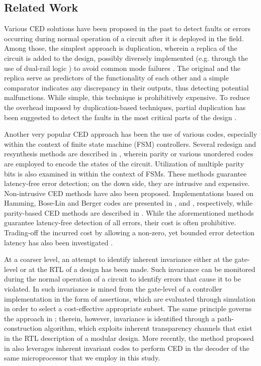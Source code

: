 \documentclass[12pt]{yalephd}
\begin{document}
\subsection{Related Work}\label{sC3sPrevious}

Various CED solutions \cite{GoGr93,MiMc00} have been proposed in the past to detect faults or errors occurring during normal operation of a circuit after it is deployed in the field. Among those, the simplest approach is duplication, wherein a replica of the circuit is added to the design, possibly diversely implemented (e.g. through the use of dual-rail logic \cite{923436}) to avoid common mode failures \cite{AvKe84}. The original and the replica serve as predictors of the functionality of each other and a simple comparator indicates any discrepancy in their outputs, thus detecting potential malfunctions. While simple, this technique is prohibitively expensive. To reduce the overhead imposed by duplication-based techniques, partial duplication has been suggested to detect the faults in the most critical parts of the design \cite{Mo03b}.

Another very popular CED approach has been the use of various codes, especially within the context of finite state machine (FSM) controllers. Several redesign and resynthesis methods are described in \cite{AkSo75, DhVr88}, wherein parity or various unordered codes are employed to encode the states of the circuit. Utilization of multiple parity bits is also examined in \cite{ZSM98} within the context of FSMs. These methods guarantee latency-free error detection; on the down side, they are intrusive and expensive. Non-intrusive CED methods have also been proposed. Implementations based on Hamming, Bose-Lin and Berger codes are presented in \cite{1030186}, \cite{670885} and \cite{229762}, respectively, while parity-based CED methods are described in \cite{GoGr93,ADM06,1676055}. While the aforementioned methods guarantee latency-free detection of all errors, their cost is often prohibitive. Trading-off the incurred cost by allowing a non-zero, yet bounded error detection latency has also been investigated \cite{AMD04}.

At a coarser level, an attempt to identify inherent invariance either at the gate-level \cite{VJAPG08} or at the RTL \cite{1308673} of a design has been made. Such invariance can be monitored during the normal operation of a circuit to identify errors that cause it to be violated. In \cite{VJAPG08} such invariance is mined from the gate-level of a controller implementation in the form of assertions, which are evaluated through simulation in order to select a cost-effective appropriate subset. The same principle governs the approach in \cite{1308673}; therein, however, invariance is identified through a path-construction algorithm, which exploits inherent transparency channels that exist in the RTL description of a modular design. More recently, the method proposed in \cite{MROJG08} also leverages inherent invariant codes to perform CED in the decoder of the same microprocessor that we employ in this study.
\end{document}
